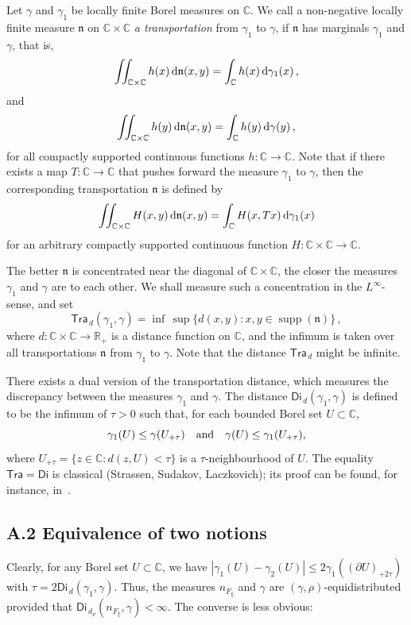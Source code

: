 \documentclass[11pt]{amsart}
\numberwithin{equation}{section}
\newcommand{\bR}{\mathbb R}
\newcommand{\bC}{\mathbb C}
\begin{document}
Let $\gamma$ and $\gamma_1$ be locally finite Borel measures on $\bC$. We call a non-negative locally finite measure $\mathfrak n$ on $\bC\times\bC$ {\em a transportation} from $\gamma_1$ to $\gamma$, if $\mathfrak n$ has marginals $\gamma_1$ and $\gamma$, that is,
\[
\iint_{\bC \times\bC} h(x)\, {\rm d}\mathfrak n (x, y)
= \int_{\bC} h(x)\, {\rm d}\gamma_1 (x)\,,
\]
and
\[
\iint_{\bC \times\bC} h(y)\, {\rm d}\mathfrak n (x, y)
= \int_{\bC} h(y)\, {\rm d}\gamma (y)\,,
\]
for all compactly supported continuous functions $h\colon\bC\to \bC$.
Note that if there exists a map $T\colon \bC\to\bC$ that pushes forward the
measure $\gamma_1$ to $\gamma$, then the corresponding transportation $\mathfrak n$ is defined
by
\[
\iint_{\bC\times\bC} H(x, y)\, {\rm d}\mathfrak n(x, y)
= \int_{\bC} H(x, Tx)\, {\rm d}\gamma_1(x)
\]
for an arbitrary compactly supported continuous function
$H\colon \bC\times\bC\to \bC$.

The better $\mathfrak n$ is concentrated near the diagonal of $\bC \times\bC $, the closer
the measures $\gamma_1$ and $\gamma$ are to each other. We shall measure such a concentration in the $L^\infty$-sense, and set
\[
\mathsf{Tra}_{\,d}(\gamma_1, \gamma) =
\inf\, \sup\{{d}(x, y)\colon x, y \in \operatorname{supp}(\mathfrak n)\}\,,
\]
where ${d}\colon \bC\times\bC\to \bR_+$ is a distance function on $\bC$, and the infimum
is taken over all transportations $\mathfrak n$ from $\gamma_1$ to $\gamma$.
Note that the distance $\mathsf{Tra}_{\,d}$ might be infinite.

There exists a dual version of the transportation distance,
which measures the discrepancy between the measures $\gamma_1$ and $\gamma$.
The distance $\mathsf{Di}_{\, d}(\gamma_1, \gamma)$ is defined to be the infimum of $\tau>0$ such that, for each bounded Borel set $U\subset\bC$,
\begin{equation}\label{eq:Di}
\gamma_1(U)\le \gamma(U_{+\tau})  \quad {\rm and} \quad \gamma(U)\le \gamma_1(U_{+\tau}),
\end{equation}
where $U_{+\tau} = \{z\in\bC\colon d(z, U)< \tau\}$ is a $\tau$-neighbourhood of $U$.
The equality $ \mathsf{Tra} = \mathsf{Di} $ is classical (Strassen, Sudakov, Laczkovich);
its proof can be found, for instance, in~\cite[Appendix~A-1]{ST-Transp}.

\subsection*{A.2 Equivalence of two notions}
Clearly, for any Borel set $U\subset\bC$, we have
$|\gamma_1 (U) - \gamma_2(U)| \le 2 \gamma_1 ((\partial U)_{+2\tau}) $
with $\tau = 2 \mathsf{Di}_{\, d}(\gamma_1, \gamma)$. Thus, the measures
$n_{F_\xi}$ and $\gamma$ are $(\gamma, \rho)$-equidistributed provided that
$\mathsf{Di}_{\, d_\rho}(n_{F_\xi}, \gamma)<\infty$. The converse is less obvious:
\end{document}
